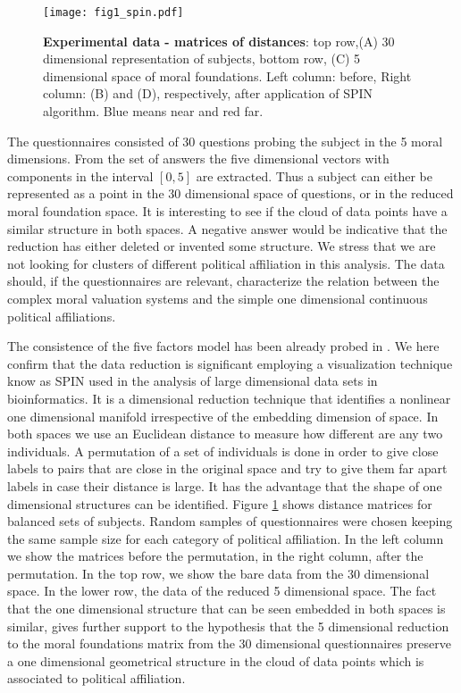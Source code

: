 \documentclass[twocolumn,showpacs]{revtex4-1}
\begin{document}
\begin{widetext}
\begin{figure}[!ht]		
\centering \texttt{[image: fig1\_spin.pdf]}
\centering \caption{{\bf Experimental data - matrices of distances}: top row,(A) 30 dimensional representation of
 subjects, bottom row, (C) 5 dimensional space of moral foundations. 
Left column: before, Right column: (B) and (D), respectively, after 
application of SPIN algorithm. Blue means near and red far.}
\label{fig:figspin}
\end{figure}
\end{widetext}

The questionnaires consisted of 30 questions probing the subject in the
5 moral dimensions. From the set of answers
the five dimensional vectors with components in the interval $[0,5]$ are extracted.
Thus a subject can either be represented as a point in the 30 dimensional
space of questions, or in the reduced moral foundation space. 
It is interesting to see if the cloud
of data points have a similar
structure in both spaces. A negative answer would be 
indicative that the reduction has either deleted or invented some structure. We stress that we are not looking for clusters of different
political affiliation in this analysis. The 
data should, if the questionnaires are relevant, characterize 
the relation between the complex moral valuation systems and 
the simple one dimensional continuous political affiliations.



The consistence of the five factors model has been already probed in \cite{Graham}.
We here confirm that the data reduction is significant 
employing a visualization technique know as SPIN 
\cite{Domany} used in the analysis of large dimensional
data sets in bioinformatics. It is a dimensional reduction 
technique that identifies a nonlinear one dimensional manifold 
irrespective of the embedding dimension of space.
  In both spaces we use an Euclidean
distance to measure how different are any two individuals. A permutation
of a set of individuals is done in order to give close labels to 
pairs that are close in the original space and try to give them 
far apart labels in case their distance is large. 
It has the advantage
that the shape of one dimensional  structures can be identified. Figure \ref{fig:figspin} shows 
distance matrices for balanced sets of subjects. Random samples of 
questionnaires were chosen keeping the same sample size for each category 
of political affiliation.
In the left column we show the matrices before the permutation, in the 
right column, after the permutation. In the top row, we show the bare
data from the 30 dimensional space. In the lower row, the data of
the reduced 5 dimensional space. 
The fact that the  one dimensional structure that
can be seen embedded in both spaces is similar, gives further support to the 
hypothesis that the 5 dimensional reduction to the moral foundations
matrix from the 30 dimensional questionnaires preserve a one dimensional
geometrical structure in the cloud of data points which is associated
to political affiliation. 
\end{document}
